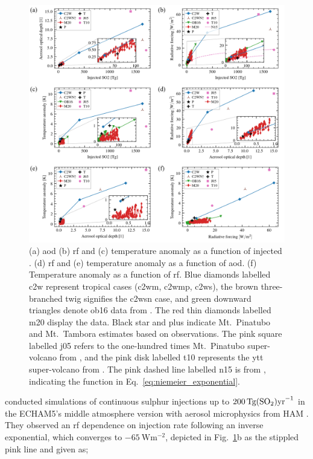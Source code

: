 \documentclass{ametsocV6.1}
\newcommand{\iso}[1][i]{{#1}njected \ce{SO2}}
\begin{document}
\begin{figure}
  \centering
  \includegraphics{figures/figure4.png}

  \caption{(a) \gls{aod} (b) \gls{rf} and (c) temperature anomaly as a function of
    \iso{}\@. (d) \gls{rf} and (e) temperature anomaly as a function of \gls{aod}. (f)
    Temperature anomaly as a function of \gls{rf}. Blue diamonds labelled \gls{c2w}
    represent tropical cases (\gls{c2wm}, \gls{c2wmp}, \gls{c2ws}), the brown three-branched
    twig signifies the \gls{c2wsn} case, and green downward triangles denote \gls{ob16} data
    from \citet{ottobliesner2016}. The red thin diamonds labelled \gls{m20} display the
    \citet{marshall2020dataset} data. Black star and plus indicate Mt.\ Pinatubo and Mt.\
    Tambora estimates based on observations. The pink square labelled \gls{j05} refers to
    the one-hundred times Mt.\ Pinatubo super-volcano from \citet{jones2005}, and the pink
    disk labelled \gls{t10} represents the \gls{ytt} super-volcano from
    \citet{timmreck2010}. The pink dashed line labelled \gls{n15} is from
    \citet{niemeier2015}, indicating the function in
    Eq.~\ref{eq:niemeier_exponential}.}\label{fig:parameter_scan}%
\end{figure}

\citet{niemeier2015} conducted simulations of continuous sulphur injections up to
\(\SI{200}{\tera\gram(\ce{SO2})\mathrm{yr}^{-1}}\) in the ECHAM5's middle atmosphere
version \citep{giorgetta2006} with aerosol microphysics from HAM \citep{stier2005}. They
observed an \gls{rf} dependence on injection rate following an inverse exponential,
which converges to \(\SI{-65}{\watt\meter^{-2}}\), depicted in
Fig.~\ref{fig:parameter_scan}b as the stippled pink line and given as;
\end{document}
